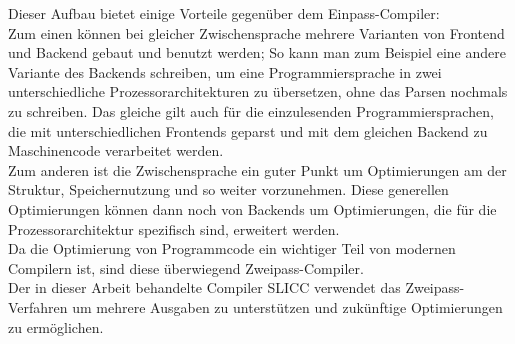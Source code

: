 Dieser Aufbau bietet einige Vorteile gegenüber dem Einpass-Compiler:\\
Zum einen können bei gleicher Zwischensprache mehrere Varianten von Frontend und Backend gebaut und benutzt werden;
So kann man zum Beispiel eine andere Variante des Backends schreiben, um eine Programmiersprache in zwei unterschiedliche Prozessorarchitekturen zu übersetzen, ohne das Parsen nochmals zu schreiben.
Das gleiche gilt auch für die einzulesenden Programmiersprachen, die mit unterschiedlichen Frontends geparst und mit dem gleichen Backend zu Maschinencode verarbeitet werden.\\
Zum anderen ist die Zwischensprache ein guter Punkt um Optimierungen am der Struktur, Speichernutzung und so weiter vorzunehmen.
Diese generellen Optimierungen können dann noch von Backends um Optimierungen, die für die Prozessorarchitektur spezifisch sind, erweitert werden.\\
Da die Optimierung von Programmcode ein wichtiger Teil von modernen Compilern ist, sind diese überwiegend Zweipass-Compiler\cite{mossenbock:2024}.\\

Der in dieser Arbeit behandelte Compiler SLICC verwendet das Zweipass-Verfahren um mehrere Ausgaben zu unterstützen und zukünftige Optimierungen zu ermöglichen.
